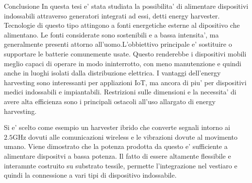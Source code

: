 \documentclass[12pt,a4paper]{extreport}
\begin{document}
\begin{chapter}{Conclusione}
    In questa tesi e' stata studiata la possibilita' di alimentare dispositivi indossabili attraverso generatori integrati ad essi, detti energy harvester. Tecnologie di questo tipo attingono a fonti energetiche esterne al dipositivo che alimentano. Le fonti considerate sono sostenibili e a bassa intensita', ma generalmente presenti attorno all'uomo.L'obbiettivo principale e' sostituire o supportare le batterie comunemente usate. Questo renderebbe i dispositivi mobili meglio capaci di operare in modo ininterrotto, con meno manutenzione e quindi anche in luoghi isolati dalla distribuzione elettrica. I vantaggi dell'energy harvesting sono interessanti per appliazioni IoT, ma ancora di piu' per dispositivi medici indossabili e impiantabili. Restrizioni sulle dimensioni e la necessita' di avere alta efficienza sono i principali ostacoli all'uso allargato di energy harvesting. 

    Si e' scelto come esempio un harvester ibrido che converte segnali intorno ai \(2.5\mathrm{GHz}\) dovuti alle comunicazioni wireless e le vibrazioni dovute al movimento umano. Viene dimostrato che la potenza prodotta da questo e' sufficiente a alimentare dispositvi a bassa potenza. Il fatto di essere altamente flessibile e interamnte costruito su substrato tessile, permette l'integrazione nel vestiaro e quindi la connessione a vari tipi di dispositivo indossabile.  
\end{chapter}




\end{document}
